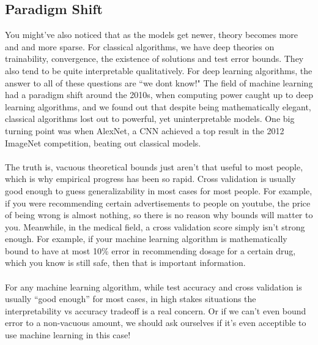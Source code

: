 \documentclass[11pt]{article}
\begin{document}
\subsection{Paradigm Shift}
You might've also noticed that as the models get newer, theory becomes more and and more sparse. For classical algorithms, we have deep theories on trainability, convergence, the existence of solutions and test error bounds. They also tend to be 
quite interpretable qualitatively. For deep learning algorithms, the answer to all of these questions are ``we dont know!" The field of machine learning had a paradigm shift around the 2010s, when computing power caught up to deep learning algorithms, and
we found out that despite being mathematically elegant, classical algorithms lost out to powerful, yet uninterpretable models. One big turning point was when AlexNet, a CNN achieved a top result in the 2012 ImageNet competition, beating out classical models.
\\
\\
The truth is, vacuous theoretical bounds just aren't that useful to most people, which is why empirical progress has been so rapid. Cross validation is usually good enough to guess generalizability in most cases for most people.
For example, if you were recommending certain advertisements to people on youtube, the price of being wrong is almost
nothing, so there is no reason why bounds will matter to you. Meanwhile, in the medical field, a cross validation score simply isn't strong enough. For example, if your machine learning algorithm is mathematically bound to have at most 10\% error in recommending
dosage for a certain drug, which you know is still safe, then that is important information.
\\
\\
For any machine learning algorithm, while test accuracy and cross validation is usually ``good enough'' for most cases, in high stakes situations the interpretability vs accuracy tradeoff is a real concern. Or if we can't even bound error to a non-vacuous amount,
we should ask ourselves if it's even acceptible to use machine learning in this case!
\end{document}
